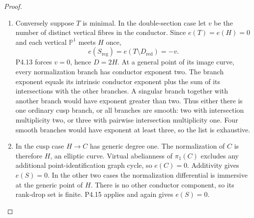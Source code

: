 \begin{proof}
\begin{enumerate}[label={$\langle1\rangle$\arabic*.},leftmargin=*]
\item Conversely suppose $T$ is minimal. In the double-section
case let $v$ be the number of distinct vertical fibres
in the conductor. Since $e(T)=e(H)=0$ and each vertical
$\mathbb P^1$ meets $H$ once,
\[
 e(S_{\mathrm{reg}})=e(T\setminus D_{\mathrm{red}})=-v.
\]
P4.13 forces $v=0$, hence $D=2H$. At a general point
of its image curve, every normalization branch has
conductor exponent two. The branch exponent equals
its intrinsic conductor exponent plus the sum of its
intersections with the other branches. A singular
branch together with another branch would have
exponent greater than two. Thus either there is one
ordinary cusp branch, or all branches are smooth:
two with intersection multiplicity two, or three
with pairwise intersection multiplicity one. Four
smooth branches would have exponent at least three,
so the list is exhaustive.

\item In the cusp case $H\to C$ has generic degree one.
The normalization of $C$ is therefore $H$, an elliptic
curve. Virtual abelianness of $\pi_1(C)$ excludes any
additional point-identification graph cycle, so
$e(C)=0$. Additivity gives $e(S)=0$. In the other two
cases the normalization differential is immersive at
the generic point of $H$. There is no other conductor
component, so its rank-drop set is finite. P4.15
applies and again gives $e(S)=0$.

\end{enumerate}
\end{proof}